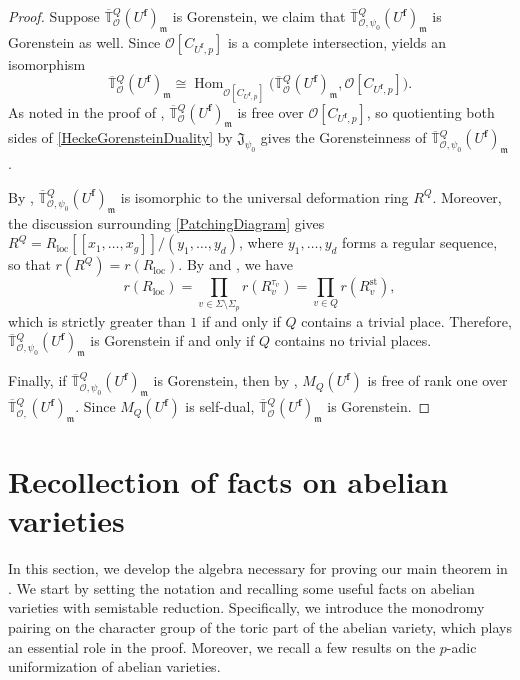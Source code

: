 \documentclass[a4paper, notitlepage, 10pt]{amsart}
\theoremstyle{plain} %
\theoremstyle{definition} %
\theoremstyle{remark} %
\numberwithin{equation}{section}
\newcommand{\bbT}{\mathbb T}
\newcommand{\Hom}{\operatorname{Hom}} %
\newcommand{\st}{\operatorname{st}}
\begin{document}
\begin{proof} Suppose  $\overline{\bbT}{}^{Q}_{\mathcal{O}}(U^{\mathbf{f}})_{\mathfrak{m}}$ is Gorenstein, we claim that $\overline{\bbT}{}^{Q}_{\mathcal{O},\psi_0}(U^{\mathbf{f}})_{\mathfrak{m}}$ is Gorenstein as well. Since $\mathcal{O}[C_{U^{\mathbf{f}},p}]$ is a complete intersection, \cite[Theorem 21.15]{Eisen} yields an isomorphism
\begin{equation}\label{HeckeGorensteinDuality}
    \overline{\bbT}{}^{Q}_{\mathcal{O}}(U^{\mathbf{f}})_{\mathfrak{m}}\cong \Hom_{\mathcal{O}[C_{U^{\mathbf{f}},p}]}\big(\overline{\bbT}{}^{Q}_{\mathcal{O}}(U^{\mathbf{f}})_{\mathfrak{m}},\mathcal{O}[C_{U^{\mathbf{f}},p}]\big).
\end{equation}
 As noted in the proof of , $\overline{\bbT}{}^{Q}_{\mathcal{O}}(U^{\mathbf{f}})_{\mathfrak{m}}$ is free over $\mathcal{O}[C_{U^{\mathbf{f}},p}]$, so quotienting both sides of \eqref{HeckeGorensteinDuality} by $\mathfrak{J}_{\psi_0}$ gives the Gorensteinness of $\overline{\bbT}{}^{Q}_{\mathcal{O},\psi_0}(U^{\mathbf{f}})_{\mathfrak{m}}$.


    By , $\overline{\bbT}{}^{Q}_{\mathcal{O},\psi_0}(U^{\mathbf{f}})_{\mathfrak{m}}$ is isomorphic to the universal deformation ring $R^Q$. Moreover, the discussion surrounding \eqref{PatchingDiagram} gives $R^Q=R_{\text{loc}}[[x_1,\dots,x_g]]/(y_1,\dots,y_d)$, where $y_1,\dots,y_d$ forms a regular sequence, so that   $r(R^Q)=r(R_{\text{loc}})$. By  and , we have 
    $$r(R_{\text{loc}})= \prod_{v\in \Sigma\setminus \Sigma_p} r(R_v^{\tau_v})=\prod_{v\in Q} r(R_v^{\st}),$$
    which is strictly greater than $1$ if and only if $Q$ contains a trivial place. Therefore, $\overline{\bbT}{}^{Q}_{\mathcal{O},\psi_0}(U^{\mathbf{f}})_{\mathfrak{m}}$ is Gorenstein if and only if $Q$ contains no trivial places. 

    Finally, if $\overline{\bbT}{}^{Q}_{\mathcal{O},\psi_0}(U^{\mathbf{f}})_{\mathfrak{m}}$ is Gorenstein, then by , $M_Q(U^{\mathbf{f}})$ is free of rank one over $\overline{\bbT}{}^{Q}_{\mathcal{O},}(U^{\mathbf{f}})_{\mathfrak{m}}$. Since $M_Q(U^{\mathbf{f}})$ is self-dual, $\overline{\bbT}{}^{Q}_{\mathcal{O}}(U^{\mathbf{f}})_{\mathfrak{m}}$ is Gorenstein.
\end{proof}
\section{Recollection of facts on abelian varieties}\label{factsonAB}
In this section, we develop the algebra necessary for proving our main theorem in . We start by setting the notation and  recalling some useful facts on abelian varieties with semistable reduction. Specifically, we introduce the monodromy pairing on the character group of the toric part of the abelian variety, which plays an essential role in the proof. Moreover, we recall a few results on the $p$-adic uniformization of abelian varieties. 
\end{document}
